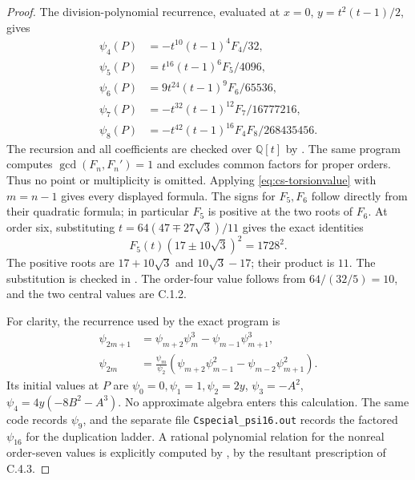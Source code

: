\begin{proof}
The division-polynomial recurrence, evaluated at $x=0$,
$y=t^2(t-1)/2$, gives
\[
 \begin{aligned}
 \psi_4(P)&=-t^{10}(t-1)^4F_4/32,\\
 \psi_5(P)&=t^{16}(t-1)^6F_5/4096,\\
 \psi_6(P)&=9t^{24}(t-1)^9F_6/65536,\\
 \psi_7(P)&=-t^{32}(t-1)^{12}F_7/16777216,\\
 \psi_8(P)&=-t^{42}(t-1)^{16}F_4F_8/268435456.
 \end{aligned}
\]
The recursion and all coefficients are checked over $\mathbb Q[t]$
by . The same program computes
$\gcd(F_n,F_n')=1$ and excludes common factors for proper orders.
Thus no point or multiplicity is omitted. Applying
\eqref{eq:cs-torsionvalue} with $m=n-1$ gives every displayed
formula. The signs for $F_5,F_6$ follow directly from their quadratic
formula; in particular $F_5$ is positive at the two roots of $F_6$.
At order six, substituting
$t=64(47\mp27\sqrt3)/11$ gives the exact identities
\[
 F_5(t)(17\pm10\sqrt3)^2=1728^2.
\]
The positive roots are $17+10\sqrt3$ and $10\sqrt3-17$; their
product is $11$. The substitution is checked in
. The order-four value follows from
$64/(32/5)=10$, and the two central values are C.1.2.

For clarity, the recurrence used by the exact program is
\[
 \begin{aligned}
 \psi_{2m+1}&=\psi_{m+2}\psi_m^3-\psi_{m-1}\psi_{m+1}^3,\\
 \psi_{2m}&=\frac{\psi_m}{\psi_2}
   (\psi_{m+2}\psi_{m-1}^2-\psi_{m-2}\psi_{m+1}^2).
 \end{aligned}
\]
Its initial values at $P$ are $\psi_0=0,\psi_1=1,\psi_2=2y$,
$\psi_3=-A^2$, $\psi_4=4y(-8B^2-A^3)$. No approximate algebra
enters this calculation. The same code records $\psi_9$, and the
separate file \texttt{Cspecial\_psi16.out} records the factored
$\psi_{16}$ for the duplication ladder. A rational polynomial
relation for the nonreal order-seven values is explicitly computed
by , by the resultant prescription
of C.4.3.
\end{proof}


